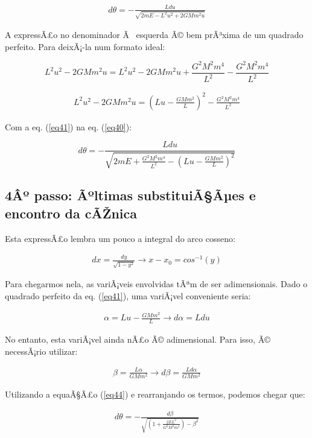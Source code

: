 \begin{eqnarray}
	d\theta = -\frac{Ldu}{\sqrt{2mE -  L^2u^2 + 2GMm^2u}} \label{eq40}
\end{eqnarray}

A expressÃ£o no denominador Ã  esquerda Ã© bem prÃ³xima de um quadrado perfeito. Para deixÃ¡-la num formato ideal:

\[
	L^2u^2 - 2GMm^2u = L^2u^2 - 2GMm^2u + \frac{G^2M^2m^4}{L^2} - \frac{G^2M^2m^4}{L^2}
\]

\begin{eqnarray}
	L^2u^2 - 2GMm^2u = \left(Lu - \frac{GMm^2}{L}\right)^2 - \frac{G^2M^2m^4}{L^2} \label{eq41}
\end{eqnarray}

Com a eq. (\ref{eq41}) na eq. (\ref{eq40}):

\[
	d\theta = -\frac{Ldu}{\sqrt{2mE + \frac{G^2M^2m^4}{L^2} - \left(Lu - \frac{GMm^2}{L}\right)^2}}
\]

\subsection{4Âº passo: Ãºltimas substituiÃ§Ãµes e encontro da cÃŽnica}

Esta expressÃ£o lembra um pouco a integral do arco cosseno:

\begin{eqnarray}
	dx = \frac{dy}{\sqrt{1-y^2}}\rightarrow x- x_0 = cos^{-1}(y) \label{eq42}
\end{eqnarray}

Para chegarmos nela, as variÃ¡veis envolvidas tÃªm de ser adimensionais. Dado o quadrado perfeito da eq.  (\ref{eq41}), uma variÃ¡vel conveniente seria:

\begin{eqnarray}
	\alpha = Lu - \frac{GMm^2}{L}  \rightarrow d\alpha = Ldu \label{eq43}
\end{eqnarray}

No entanto, esta variÃ¡vel ainda nÃ£o Ã© adimensional. Para isso, Ã© necessÃ¡rio utilizar:

\begin{eqnarray}
	\beta = \frac{L\alpha}{GMm^2} \rightarrow d\beta = \frac{Ld\alpha}{GMm^2} \label{eq44}
\end{eqnarray}

Utilizando a equaÃ§Ã£o (\ref{eq44}) e rearranjando os termos, podemos chegar que:

\begin{eqnarray}
	d\theta = -\frac{d\beta}{\sqrt{\left(1 + \frac{2EL^2}{G^2M^2m^3}\right) - \beta^2}} \label{eq45}
\end{eqnarray}

